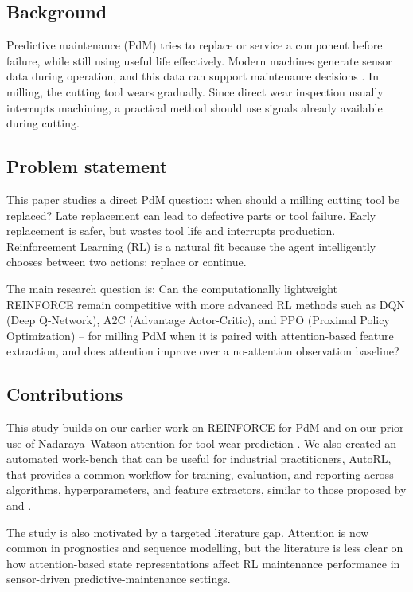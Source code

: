 \documentclass[sn-basic]{sn-jnl}%
\begin{document}
\subsection{Background}
Predictive maintenance (PdM) tries to replace or service a component before failure, while still using useful life effectively. Modern machines generate sensor data during operation, and this data can support maintenance decisions \cite{Zonta2020, Compare2020}. In milling, the cutting tool wears gradually. Since direct wear inspection usually interrupts machining, a practical method should use signals already available during cutting.

\subsection{Problem statement}
This paper studies a direct PdM question: when should a milling cutting tool be replaced? Late replacement can lead to defective parts or tool failure. Early replacement is safer, but wastes tool life and interrupts production. Reinforcement Learning (RL) is a natural fit because the agent intelligently chooses between two actions: replace or continue.

The main research question is: Can the computationally lightweight \textsc{REINFORCE} remain competitive with more advanced RL methods such as \textsc{DQN} (Deep Q-Network), \textsc{A2C} (Advantage Actor-Critic), and \textsc{PPO} (Proximal Policy Optimization) -- for milling PdM when it is paired with attention-based feature extraction, and does attention improve over a no-attention observation baseline?

\subsection{Contributions}

This study builds on our earlier work on \textsc{REINFORCE} for PdM \cite{Siraskar2025} and on our prior use of Nadaraya--Watson attention for tool-wear prediction \cite{Siraskar2024}. We also created an automated work-bench that can be useful for industrial practitioners, AutoRL, that provides a common workflow for training, evaluation, and reporting across algorithms, hyperparameters, and feature extractors, similar to those proposed by \cite{Faust2019} and \cite{Mussi2022}.

The study is also motivated by a targeted literature gap. Attention is now common in prognostics and sequence modelling, but the literature is less clear on how attention-based state representations affect RL maintenance performance in sensor-driven predictive-maintenance settings.
\end{document}
